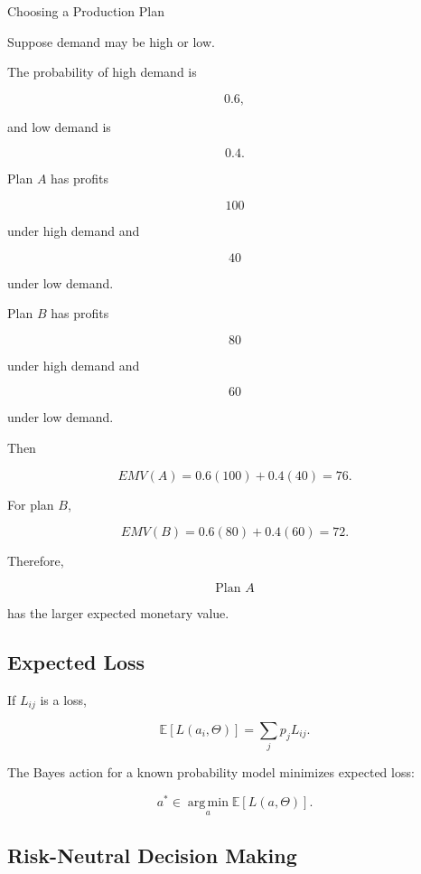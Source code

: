 \begin{workedexamplebox}{Choosing a Production Plan}

Suppose demand may be high or low.

The probability of high demand is

\[
0.6,
\]

and low demand is

\[
0.4.
\]

Plan \(A\) has profits

\[
100
\]

under high demand and

\[
40
\]

under low demand.

Plan \(B\) has profits

\[
80
\]

under high demand and

\[
60
\]

under low demand.

Then

\[
EMV(A)
=
0.6(100)
+
0.4(40)
=
76.
\]

For plan \(B\),

\[
EMV(B)
=
0.6(80)
+
0.4(60)
=
72.
\]

Therefore,

\begin{answerbox}
\[
\boxed{
\text{Plan }A
}
\]

has the larger expected monetary value.
\end{answerbox}

\end{workedexamplebox}

\subsection{Expected Loss}
\label{subsec:expected-loss}

If \(L_{ij}\) is a loss,

\[
\boxed{
\mathbb{E}
[
L(a_i,\Theta)
]
=
\sum_j
p_jL_{ij}.
}
\]

The Bayes action for a known probability model minimizes expected loss:

\[
\boxed{
a^*
\in
\operatorname*{arg\,min}_a
\mathbb{E}
[
L(a,\Theta)
].
}
\]

\subsection{Risk-Neutral Decision Making}
\label{subsec:risk-neutral-decision-making}

